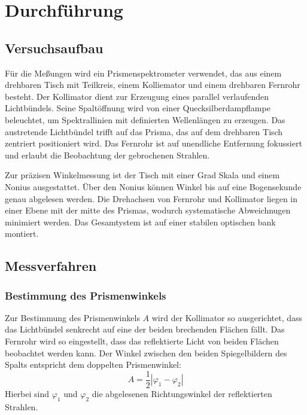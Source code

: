 \chapter{Durchführung}
\label{ch:durchfuerung}

\section{Versuchsaufbau}

Für die Meßungen wird ein Prismenspektrometer verwendet, das aus einem drehbaren Tisch mit Teilkreis, einem Kolliemator und einem drehbaren Fernrohr besteht. Der Kollimator dient zur Erzeugung eines parallel verlaufenden Lichtbündels. Seine Spaltöffnung wird von einer Quecksilberdampflampe beleuchtet, um Spektrallinien mit definierten Wellenlängen zu erzeugen. Das austretende Lichtbündel trifft auf das Prisma, das auf dem drehbaren Tisch zentriert positioniert wird. Das Fernrohr ist auf unendliche Entfernung fokussiert und erlaubt die Beobachtung der gebrochenen Strahlen.

Zur präzisen Winkelmessung ist der Tisch mit einer Grad Skala und einem Nonius ausgestattet. Über den Nonius können Winkel bis auf eine Bogensekunde genau abgelesen werden. Die Drehachsen von Fernrohr und Kollimator liegen in einer Ebene mit der mitte des Prismas, wodurch systematische Abweichnugen minimiert werden. Das Gesamtystem ist auf einer stabilen optischen bank montiert.

\section{Messverfahren}

\subsection{Bestimmung des Prismenwinkels}
Zur Bestimmung des Prismenwinkels \(A\) wird der Kollimator so ausgerichtet, dass das Lichtbündel senkrecht auf eine der beiden brechenden Flächen fällt. Das Fernrohr wird so eingestellt, dass das reflektierte Licht von beiden Flächen beobachtet werden kann. Der Winkel zwischen den beiden Spiegelbildern des Spalts entspricht dem doppelten Prismenwinkel:
\begin{equation}
A = \frac{1}{2} \left| \varphi_1 - \varphi_2 \right|
\label{eq:prismenwinkel}
\end{equation}
Hierbei sind \(\varphi_1\) und \(\varphi_2\) die abgelesenen Richtungswinkel der reflektierten Strahlen.

